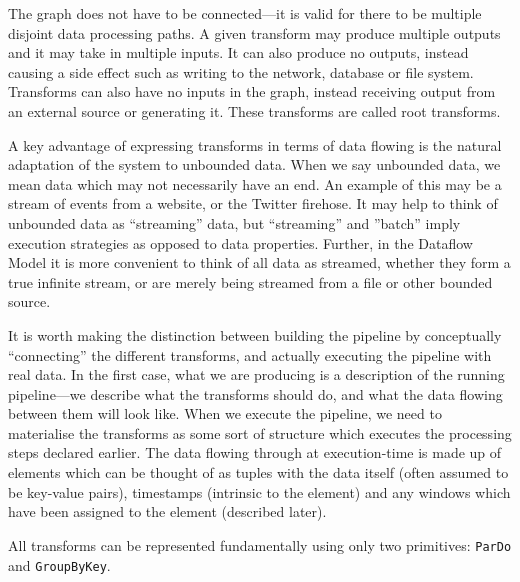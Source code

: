The graph does not have to be connected---it is valid for there to be multiple disjoint data processing paths.
A given transform may produce multiple outputs and it may take in multiple inputs.
It can also produce no outputs, instead causing a side effect such as writing to the network, database or file system.
Transforms can also have no inputs in the graph, instead receiving output from an external source or generating it.
These transforms are called root transforms.

A key advantage of expressing transforms in terms of data flowing is the natural adaptation of the system to unbounded data.
When we say unbounded data, we mean data which may not necessarily have an end.
An example of this may be a stream of events from a website, or the Twitter firehose.
It may help to think of unbounded data as ``streaming'' data, but ``streaming'' and ''batch'' imply execution strategies as opposed to data properties.
Further, in the Dataflow Model it is more convenient to think of all data as streamed, whether they form a true infinite stream, or are merely being streamed from a file or other bounded source.

It is worth making the distinction between building the pipeline by conceptually ``connecting'' the different transforms, and actually executing the pipeline with real data.
In the first case, what we are producing is a description of the running pipeline---we describe what the transforms should do, and what the data flowing between them will look like.
When we execute the pipeline, we need to materialise the transforms as some sort of structure which executes the processing steps declared earlier.
The data flowing through at execution-time is made up of elements which can be thought of as tuples with the data itself (often assumed to be key-value pairs), timestamps (intrinsic to the element) and any windows which have been assigned to the element (described later).

All transforms can be represented fundamentally using only two primitives: \verb|ParDo| and \verb|GroupByKey|\footnotemark[2].


